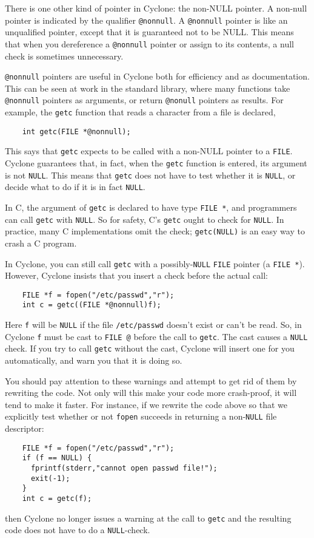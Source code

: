 There is one other kind of pointer in Cyclone: the non-NULL pointer.
A non-null pointer is indicated by the qualifier \texttt{@nonnull}.  A
\texttt{@nonnull} pointer is like an unqualified pointer, except that it is
guaranteed not to be NULL\@.  This means that when you dereference a
\texttt{@nonnull} pointer or assign to its contents, a null check is
sometimes unnecessary.

\texttt{@nonnull} pointers are useful in Cyclone both for efficiency and as
documentation.  This can be seen at work in the standard library,
where many functions take \texttt{@nonnull} pointers as arguments, or return
\texttt{@nonull} pointers as results.  For example, the \texttt{getc}
function that reads a character from a file is declared,
\begin{verbatim}
    int getc(FILE *@nonnull);
\end{verbatim}
This says that \texttt{getc} expects to be called with a non-NULL
pointer to a \texttt{FILE}\@.  Cyclone guarantees that, in fact, when
the \texttt{getc} function is entered, its argument is not \texttt{NULL}.  
This means that \texttt{getc} does not have to test whether it is 
\texttt{NULL}, or decide what to do if it is in fact \texttt{NULL}\@.

In C, the argument of \texttt{getc} is declared to have type
\texttt{FILE *}, and programmers can call \texttt{getc} with
\texttt{NULL}\@.  So for safety, C's \texttt{getc} ought to check for
\texttt{NULL}\@.  In practice, many C implementations omit the check;
\texttt{getc(NULL)} is an easy way to crash a C program.

In Cyclone, you can still call \texttt{getc} with a possibly-\texttt{NULL}
\texttt{FILE} pointer (a \texttt{FILE *}).  However, Cyclone insists
that you insert a check before the actual call:
\begin{verbatim}
    FILE *f = fopen("/etc/passwd","r");
    int c = getc((FILE *@nonnull)f);
\end{verbatim}
Here \texttt{f} will be \texttt{NULL} if the file \texttt{/etc/passwd} doesn't
exist or can't be read.  So, in Cyclone \texttt{f} must be cast to
\texttt{FILE @} before the call to \texttt{getc}.  The cast causes a
\texttt{NULL} check.  If you try to call \texttt{getc} without the cast,
Cyclone will insert one for you automatically, and warn you that it is
doing so.  

You should pay attention to these warnings and attempt
to get rid of them by rewriting the code.  Not only will this make
your code more crash-proof, it will tend to make it faster.  For
instance, if we rewrite the code above so that we explicitly
test whether or not \texttt{fopen} succeeds in returning a
non-\texttt{NULL} file descriptor:
\begin{verbatim}
    FILE *f = fopen("/etc/passwd","r");
    if (f == NULL) {
      fprintf(stderr,"cannot open passwd file!");
      exit(-1);
    }
    int c = getc(f);
\end{verbatim}
then Cyclone no longer issues a warning at the call to \texttt{getc}
and the resulting code does not have to do a \texttt{NULL}-check.

